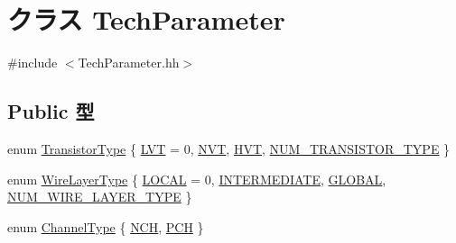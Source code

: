 \hypertarget{classTechParameter}{
\section{クラス TechParameter}
\label{classTechParameter}
}


{\ttfamily \#include $<$TechParameter.hh$>$}\subsection*{Public 型}
\begin{DoxyCompactItemize}
\item 
enum \hyperlink{classTechParameter_a397518f993183c7cff9301ba5fa9963a}{TransistorType} \{ \hyperlink{classTechParameter_a397518f993183c7cff9301ba5fa9963aa0fc42190c406d2a6718729c112ebd970}{LVT} =  0, 
\hyperlink{classTechParameter_a397518f993183c7cff9301ba5fa9963aaee7a7d46340ad0ca3413060908a16ee5}{NVT}, 
\hyperlink{classTechParameter_a397518f993183c7cff9301ba5fa9963aa3e15cae5031c9e7e7482e46111ebb7f9}{HVT}, 
\hyperlink{classTechParameter_a397518f993183c7cff9301ba5fa9963aa00657b180c93911372a9990b9741578f}{NUM\_\-TRANSISTOR\_\-TYPE}
 \}
\item 
enum \hyperlink{classTechParameter_ad43b2d048e1485eadc8c3f0469349c1a}{WireLayerType} \{ \hyperlink{classTechParameter_ad43b2d048e1485eadc8c3f0469349c1aad0ef00e708ed18ba004480dceb79ecfb}{LOCAL} =  0, 
\hyperlink{classTechParameter_ad43b2d048e1485eadc8c3f0469349c1aad970266ef8bce3b5290badb6bddc220b}{INTERMEDIATE}, 
\hyperlink{classTechParameter_ad43b2d048e1485eadc8c3f0469349c1aafde1bb5ef04b28059e61df449501f1c0}{GLOBAL}, 
\hyperlink{classTechParameter_ad43b2d048e1485eadc8c3f0469349c1aa4799c103c0eba86ea7f300aecfa0f873}{NUM\_\-WIRE\_\-LAYER\_\-TYPE}
 \}
\item 
enum \hyperlink{classTechParameter_a19a96edeeb9d37072c4ce9f862d19ba8}{ChannelType} \{ \hyperlink{classTechParameter_a19a96edeeb9d37072c4ce9f862d19ba8a27a419551d1491186c0cd69eea4c6d21}{NCH}, 
\hyperlink{classTechParameter_a19a96edeeb9d37072c4ce9f862d19ba8ac8835554b21e7e5e58d5b4af567fbc95}{PCH}
 \}
\end{DoxyCompactItemize}
